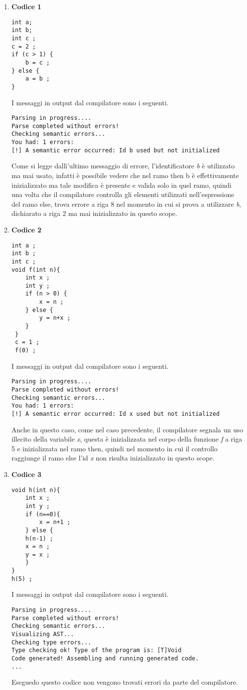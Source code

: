 \begin{enumerate}
\item \textbf{Codice 1}
\begin{verbatim}
int a;
int b;
int c ;
c = 2 ;
if (c > 1) {
    b = c ; 
} else {
    a = b ;
}
\end{verbatim}
I messaggi in output dal compilatore sono i seguenti.
\begin{verbatim}
Parsing in progress....
Parse completed without errors!
Checking semantic errors...
You had: 1 errors:
[!] A semantic error occurred: Id b used but not initialized	
\end{verbatim}
Come si legge dallì'ultimo messaggio di errore, l'identificatore \textit{b} è utilizzato ma mai usato, infatti è possibile vedere che nel ramo then b è effettivamente inizializzato ma tale modifica è presente e valida solo in quel ramo, quindi una volta che il compilatore controlla gli elementi utilizzati nell'espressione del ramo else, trova errore a riga 8 nel momento in cui si prova a utilizzare \textit{b}, dichiarato a riga 2 ma mai inizializzato in questo scope.

\item \textbf{Codice 2}
\begin{verbatim}
int a ; 
int b ; 
int c ;
void f(int n){
    int x ; 
    int y ;
    if (n > 0) {
        x = n ;
    } else {
        y = n+x ;
    }
 }
 c = 1 ;
 f(0) ;
\end{verbatim}
I messaggi in output dal compilatore sono i seguenti.
\begin{verbatim}
Parsing in progress....
Parse completed without errors!
Checking semantic errors...
You had: 1 errors:
[!] A semantic error occurred: Id x used but not initialized	
\end{verbatim}
Anche in questo caso, come nel caso precedente, il compilatore segnala un uso illecito della variabile \textit{x}, questa è inizializzata nel corpo della funzione \textit{f} a riga 5 e inizializzata nel ramo then, quindi nel momento in cui il controllo raggiunge il ramo else l'id \textit{x} non risulta inizializzato in questo scope.

\item \textbf{Codice 3}
\begin{verbatim}
void h(int n){
    int x ;
    int y ;
    if (n==0){
        x = n+1 ;
    } else {
    h(n-1) ; 
    x = n ; 
    y = x ;
    }
}    
h(5) ;
\end{verbatim}
I messaggi in output dal compilatore sono i seguenti.
\begin{verbatim}
Parsing in progress....
Parse completed without errors!
Checking semantic errors...
Visualizing AST...
Checking type errors...
Type checking ok! Type of the program is: [T]Void
Code generated! Assembling and running generated code.
...
\end{verbatim}
Eseguedo questo codice non vengono trovati errori da parte del compilatore.


\end{enumerate}
